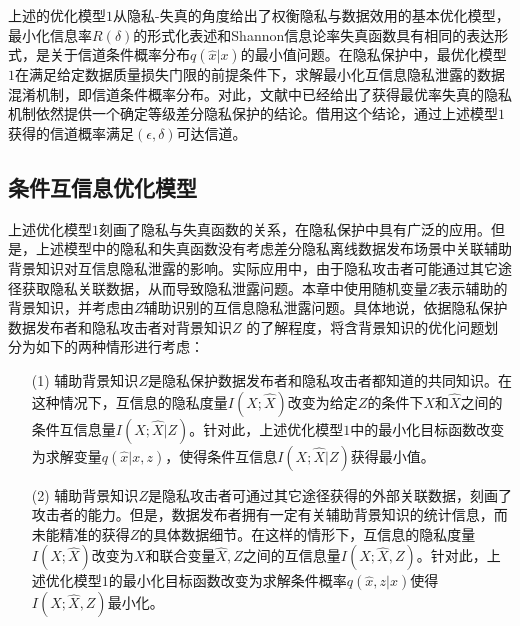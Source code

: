上述的优化模型$1$从隐私-失真的角度\cite{wang2016on}给出了权衡隐私与数据效用的基本优化模型，最小化信息率$R(\delta)$的形式化表述和Shannon信息论率失真函数\cite{cover2006elements}具有相同的表达形式，是关于信道条件概率分布$q(\hat{x}|x)$的最小值问题。在隐私保护中，最优化模型$1$在满足给定数据质量损失门限的前提条件下，求解最小化互信息隐私泄露的数据混淆机制，即信道条件概率分布。对此，文献中已经给出了获得最优率失真的隐私机制依然提供一个确定等级差分隐私保护的结论。借用这个结论，通过上述模型$1$获得的信道概率满足$(\epsilon,\delta)$可达信道。
\subsection{条件互信息优化模型}\label{subsec:chapter-05-conditional-mioptimization}

上述优化模型$1$刻画了隐私与失真函数的关系，在隐私保护中具有广泛的应用\cite{wang2016on,sarwate2014a,mir2012information}。但是，上述模型中的隐私和失真函数没有考虑差分隐私离线数据发布场景中关联辅助背景知识对互信息隐私泄露的影响。实际应用中，由于隐私攻击者可能通过其它途径获取隐私关联数据，从而导致隐私泄露问题。本章中使用随机变量$Z$表示辅助的背景知识，并考虑由$Z$辅助识别的互信息隐私泄露问题。具体地说，依据隐私保护数据发布者和隐私攻击者对背景知识$Z$
的了解程度，将含背景知识的优化问题划分为如下的两种情形进行考虑：

%
\begin{itemize}[leftmargin=2em]
\item [(1)]辅助背景知识$Z$是隐私保护数据发布者和隐私攻击者都知道的共同知识。在这种情况下，互信息的隐私度量$I(X;\hat{X})$改变为给定$Z$的条件下$X$和$\hat{X}$之间的条件互信息量$I(X;\hat{X}|Z)$。针对此，上述优化模型$1$中的最小化目标函数改变为求解变量$q(\hat{x}|x,z)$，使得条件互信息$I(X;\hat{X}|Z)$获得最小值。

\item [(2)]辅助背景知识$Z$是隐私攻击者可通过其它途径获得的外部关联数据，刻画了攻击者的能力。但是，数据发布者拥有一定有关辅助背景知识的统计信息，而未能精准的获得$Z$的具体数据细节。在这样的情形下，互信息的隐私度量$I(X;\hat{X})$改变为$X$和联合变量$\hat{X},Z$之间的互信息量$I(X;\hat{X},Z)$。针对此，上述优化模型$1$的最小化目标函数改变为求解条件概率$q(\hat{x},z|x)$使得$I(X;\hat{X},Z)$最小化。
\end{itemize}

